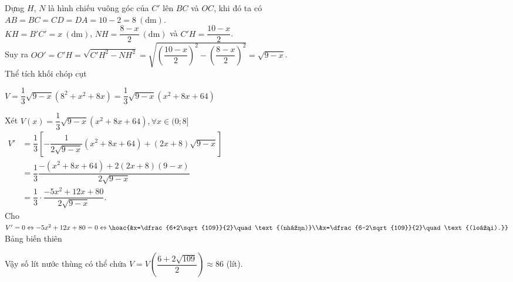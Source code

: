 \begin{bt}
{\begin{center}
\end{center}
Dựng $H$, $N$ là hình chiếu vuông góc của $C'$ lên $BC$ và $OC$, khi đó ta có\\
 $AB=BC=CD=DA=10-2=8\ \mathrm{(dm)}$.\\ 
$KH=B'C'=x\ (\mathrm{dm})$, $NH=\dfrac{8-x}{2}\ \mathrm{(dm)}$ và $C'H=\dfrac{10-x}{2}$.\\
Suy ra $OO'=C'H=\sqrt{C'H^2-NH^2}=\sqrt{\left(\dfrac{10-x}{2}\right)^2-\left(\dfrac{8-x}{2}\right)^2}=\sqrt{9-x}$.\\
Thể tích khối chóp cụt
\begin{center}
	$V=\dfrac{1}{3}\sqrt{9-x}\left(8^2+x^2+8x\right)=\dfrac{1}{3}\sqrt{9-x}\left(x^2+8x+64\right)$
\end{center}
	Xét $V(x)=\dfrac{1}{3}\sqrt{9-x}\left(x^2+8x+64\right), \forall x\in (0;8]$\\
$\begin{aligned}
	V'&=\dfrac{1}{3}\left[-\dfrac{1}{2\sqrt{9-x}}\left(x^2+8x+64\right)+(2x+8)\sqrt{9-x}\right]\\
	&=\dfrac{1}{3}\dfrac{-\left(x^2+8x+64\right)+2(2x+8)(9-x)}{2\sqrt{9-x}}\\
	&=\dfrac{1}{3}\cdot\dfrac{-5x^2+12x+80}{2\sqrt{9-x}}.
\end{aligned}$
\\
Cho $V'=0\Leftrightarrow -5x^2+12x+80=0\Leftrightarrow\hoac{&x=\dfrac{6+2\sqrt{109}}{2}\quad\text{(nhận)}\\&x=\dfrac{6-2\sqrt{109}}{2}\quad\text{(loại).}}$\\
Bảng biến thiên
\begin{center}
\end{center}
Vậy số lít nước thùng có thể chứa $V=V\left(\dfrac{6+2\sqrt{109}}{2}\right)\approx 86$ (lít).
} 
\end{bt}

